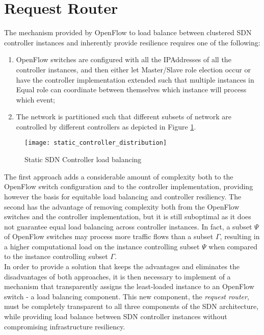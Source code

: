 \section{Request Router}
\label{section:request-router}
The mechanism provided by OpenFlow to load balance between clustered \gls{SDN} controller instances and inherently provide resilience requires one of the following:
\begin{enumerate}
	\item OpenFlow switches are configured with all the \gls{IPAddress}es of all the controller instances, and then either let Master/Slave role election occur or have the controller implementation extended such that multiple instances in Equal role can coordinate between themselves which instance will process which event;
	\item The network is partitioned such that different subsets of network are controlled by different controllers as depicted in Figure \ref{fig:static_controller_distribution}.
\end{enumerate}
%
\begin{figure}
	\centering
	\texttt{[image: static\_controller\_distribution]}
	\caption{Static SDN Controller load balancing}
	\label{fig:static_controller_distribution}
\end{figure}
%
The first approach adds a considerable amount of complexity both to the OpenFlow switch configuration and to the controller implementation, providing however the basis for equitable load balancing and controller resiliency.
The second has the advantage of removing complexity both from the OpenFlow switches and the controller implementation, but it is still suboptimal as it does not guarantee equal load balancing across controller instances. In fact, a subset $\Psi$ of OpenFlow switches may process more traffic flows than a subset $\Gamma$, resulting in a higher computational load on the instance controlling subset $\Psi$ when compared to the instance controlling subset $\Gamma$.\\
%
In order to provide a solution that keeps the advantages and eliminates the disadvantages of both approaches, it is then necessary to implement of a mechanism that transparently assigns the least-loaded instance to an OpenFlow switch - a load balancing component.
This new component, the \emph{request router}, must be completely transparent to all three components of the \gls{SDN} architecture, while providing load balance between \gls{SDN} controller instances without compromising infrastructure resiliency.\\
